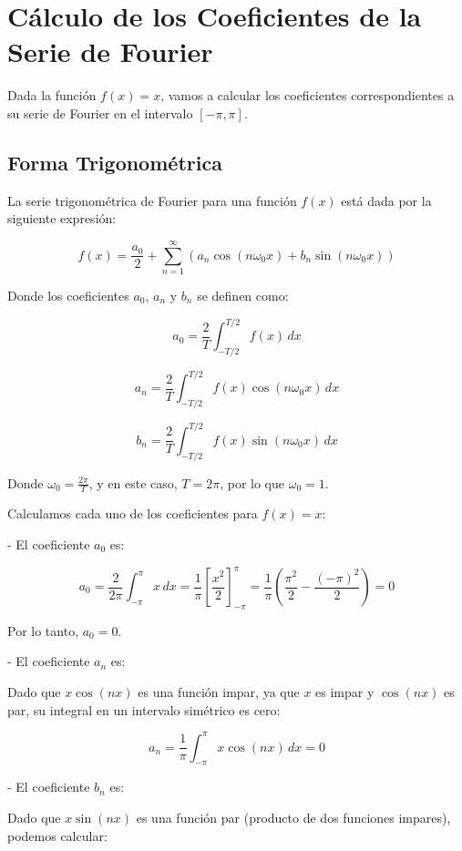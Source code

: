\chapter{Cálculo de los Coeficientes de la Serie de Fourier}\label{app:Estado-del-arte-coeff}

Dada la función \( f(x) = x \), vamos a calcular los coeficientes correspondientes a su serie de Fourier en el intervalo \([- \pi, \pi]\).

\section{Forma Trigonométrica}

La serie trigonométrica de Fourier para una función \( f(x) \) está dada por la siguiente expresión:

\[
f(x) = \frac{a_0}{2} + \sum_{n=1}^{\infty} \left( a_n \cos(n \omega_0 x) + b_n \sin(n \omega_0 x) \right)
\]

Donde los coeficientes \( a_0 \), \( a_n \) y \( b_n \) se definen como:

\[
a_0 = \frac{2}{T} \int_{-T/2}^{T/2} f(x) \, dx
\]

\[
a_n = \frac{2}{T} \int_{-T/2}^{T/2} f(x) \cos(n \omega_0 x) \, dx
\]

\[
b_n = \frac{2}{T} \int_{-T/2}^{T/2} f(x) \sin(n \omega_0 x) \, dx
\]

Donde \( \omega_0 = \frac{2\pi}{T} \), y en este caso, \( T = 2\pi \), por lo que \( \omega_0 = 1 \).

Calculamos cada uno de los coeficientes para \( f(x) = x \):

- El coeficiente \( a_0 \) es:

\[
a_0 = \frac{2}{2\pi} \int_{-\pi}^{\pi} x \, dx = \frac{1}{\pi} \left[ \frac{x^2}{2} \right]_{-\pi}^{\pi} = \frac{1}{\pi} \left( \frac{\pi^2}{2} - \frac{(-\pi)^2}{2} \right) = 0
\]

Por lo tanto, \( a_0 = 0 \).

- El coeficiente \( a_n \) es:

Dado que \( x \cos(n x) \) es una función impar, ya que \( x \) es impar y \( \cos(n x) \) es par, su integral en un intervalo simétrico es cero:

\[
a_n = \frac{1}{\pi} \int_{-\pi}^{\pi} x \cos(n x) \, dx = 0
\]

- El coeficiente \( b_n \) es:

Dado que \( x \sin(n x) \) es una función par (producto de dos funciones impares), podemos calcular:

